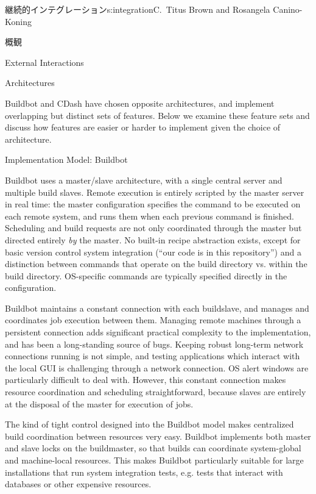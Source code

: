 \begin{aosachapter}{継続的インテグレーション}{s:integration}{C.\ Titus Brown and Rosangela Canino-Koning}
\begin{aosasect1}{概観}
\begin{aosasect2}{External Interactions}
\begin{aosadescription}
\end{aosadescription}

\end{aosasect2}

\end{aosasect1}

\begin{aosasect1}{Architectures}

Buildbot and CDash have chosen opposite architectures, and implement
overlapping but distinct sets of features. Below we examine these
feature sets and discuss how features are easier or harder to
implement given the choice of architecture.

\begin{aosasect2}{Implementation Model: Buildbot}


Buildbot uses a master/slave architecture, with a single central
server and multiple build slaves. Remote execution is entirely
scripted by the master server in real time: the master configuration
specifies the command to be executed on each remote system, and runs
them when each previous command is finished. Scheduling and build
requests are not only coordinated through the master but directed
entirely \emph{by} the master. No built-in recipe abstraction exists,
except for basic version control system integration (``our code is in
this repository'') and a distinction between commands that operate on
the build directory vs. within the build directory. OS-specific
commands are typically specified directly in the configuration.

Buildbot maintains a constant connection with each buildslave, and
manages and coordinates job execution between them.  Managing remote
machines through a persistent connection adds significant practical
complexity to the implementation, and has been a long-standing source
of bugs.  Keeping robust long-term network connections running is not
simple, and testing applications which interact with the local GUI is
challenging through a network connection. OS alert windows are
particularly difficult to deal with.  However, this constant
connection makes resource coordination and scheduling straightforward,
because slaves are entirely at the disposal of the master for
execution of jobs.

The kind of tight control designed into the Buildbot model makes
centralized build coordination between resources very easy. Buildbot
implements both master and slave locks on the buildmaster, so that
builds can coordinate system-global and machine-local resources. This
makes Buildbot particularly suitable for large installations that run
system integration tests, e.g. tests that interact with databases or
other expensive resources.


\end{aosasect2}
\end{aosasect1}
\end{aosachapter}
